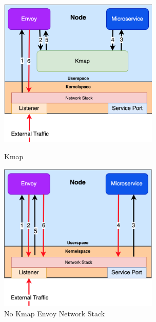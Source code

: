 \begin{figure}[!htb]
    \begin{minipage}{0.5\textwidth}
        \centering
        \includegraphics[keepaspectratio=true,width=3in]{figures/design/kmap.png}
        \caption{Kmap}
        \label{fig:kmap}
    \end{minipage}%
    \begin{minipage}{0.5\textwidth}
        \centering
        \includegraphics[keepaspectratio=true,width=3in]{figures/design/no_kmap.png}
        \caption{No Kmap Envoy Network Stack}
        \label{fig:no_kmap}
    \end{minipage}%
\end{figure}

%
%


